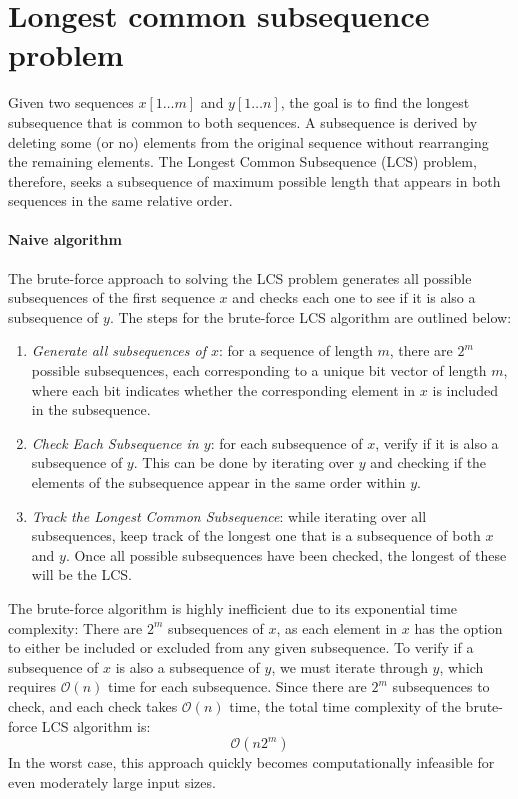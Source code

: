 \section{Longest common subsequence problem}

Given two sequences $x[1\dots m]$ and $y[1\dots n]$, the goal is to find the longest subsequence that is common to both sequences.
A subsequence is derived by deleting some (or no) elements from the original sequence without rearranging the remaining elements.
The Longest Common Subsequence (LCS) problem, therefore, seeks a subsequence of maximum possible length that appears in both sequences in the same relative order.

\paragraph*{Naive algorithm}
The brute-force approach to solving the LCS problem generates all possible subsequences of the first sequence $x$ and checks each one to see if it is also a subsequence of $y$. 
The steps for the brute-force LCS algorithm are outlined below:
\begin{enumerate}
    \item \textit{Generate all subsequences of $x$}: for a sequence of length $m$, there are $2^m$ possible subsequences, each corresponding to a unique bit vector of length $m$, where each bit indicates whether the corresponding element in $x$ is included in the subsequence.
    \item \textit{Check Each Subsequence in $y$}: for each subsequence of $x$, verify if it is also a subsequence of $y$. 
        This can be done by iterating over $y$ and checking if the elements of the subsequence appear in the same order within $y$.
    \item \textit{Track the Longest Common Subsequence}: while iterating over all subsequences, keep track of the longest one that is a subsequence of both $x$ and $y$. 
        Once all possible subsequences have been checked, the longest of these will be the LCS.
\end{enumerate}
The brute-force algorithm is highly inefficient due to its exponential time complexity:
There are $2^m$ subsequences of $x$, as each element in $x$ has the option to either be included or excluded from any given subsequence.
To verify if a subsequence of $x$ is also a subsequence of $y$, we must iterate through $y$, which requires $\mathcal{O}(n)$ time for each subsequence.
Since there are $2^m$ subsequences to check, and each check takes $\mathcal{O}(n)$ time, the total time complexity of the brute-force LCS algorithm is:
\[\mathcal{O}(n2^m)\]
In the worst case, this approach quickly becomes computationally infeasible for even moderately large input sizes.

